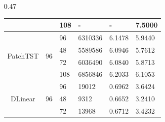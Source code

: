 \begin{table}[h]
\begin{subtable}{0.47\textwidth}
{\begin{tabular}{ccllll}
                                        &                         & 108  & -                                          & -                                          & 7.5000                                         \\
                                        \midrule
            \multirow{4}{*}{PatchTST}   & \multirow{4}{*}{96}   & 96   & 6310336                                    & 6.1478                                   & 5.9440                                       \\
            & & 48   & 5589586                                    & 6.0946                                   & 5.7612                                       \\
                                        &                         & 72   & 6036490                                    & 6.0840                                   & 5.8713                                       \\
                                                               
                                        &                         & 108  & 6856846                                    & 6.2033                                   & 6.1053                                       \\
                                        \midrule
            \multirow{4}{*}{DLinear}    & \multirow{4}{*}{96}  & 96   & 19012                                      & 0.6962                                   & 3.6424                                        \\
            & & 48   & 9312                                       & 0.6652                                   & 3.2410                                       \\
                                        &                         & 72   & 13968                                      & 0.6712                                   & 3.4232                                       \\
                                                               

\end{tabular}}
\end{subtable}
\end{table}
